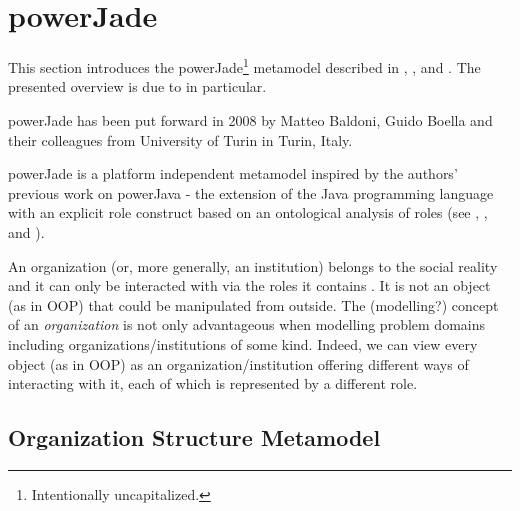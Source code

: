 \section{powerJade}

This section introduces the powerJade\footnote{Intentionally uncapitalized.} metamodel described in \cite{Baldoni08a}, \cite{Baldoni08b}, \cite{Baldoni09} and \cite{Baldoni10}.
The presented overview is due to \cite{Hahn07b} in particular.

powerJade has been put forward in 2008 by Matteo Baldoni, Guido Boella and their colleagues from University of Turin in Turin, Italy.


powerJade is a platform independent metamodel inspired by the authors' previous work on powerJava - the extension of the Java programming language with an explicit role construct based on an ontological analysis of roles (see \cite{Baldoni05}, \cite{Baldoni06a}, \cite{Baldoni06b} and \cite{Baldoni07}).

An organization (or, more generally, an institution) belongs to the social reality and it can only be interacted with via the roles it contains \cite{Boella06}.
It is not an object (as in OOP) that could be manipulated from outside.
The (modelling?) concept of an \textit{organization} is not only advantageous when modelling problem domains including organizations/institutions of some kind.
Indeed, we can view every object (as in OOP) as an organization/institution offering different ways of interacting with it, each of which is represented by a different role.

\subsection*{Organization Structure Metamodel}

